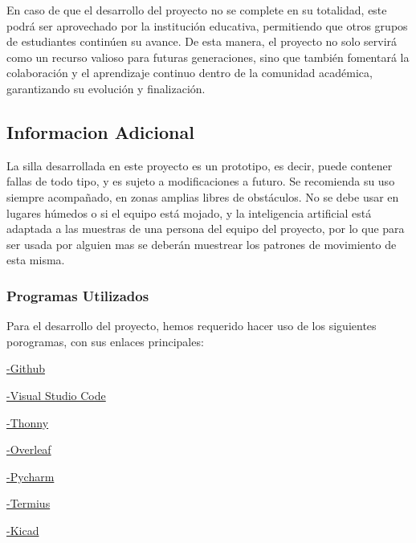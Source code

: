 \documentclass{article}
\begin{document}
En caso de que el desarrollo del proyecto no se complete en su totalidad, este podrá ser aprovechado por la institución educativa, permitiendo que otros grupos de estudiantes continúen su avance. De esta manera, el proyecto no solo servirá como un recurso valioso para futuras generaciones, sino que también fomentará la colaboración y el aprendizaje continuo dentro de la comunidad académica, garantizando su evolución y finalización.

\subsection {Informacion Adicional}
La silla desarrollada en este proyecto es un prototipo, es decir, puede contener fallas de todo tipo, y es sujeto a modificaciones a futuro. Se recomienda su uso siempre acompañado, en zonas amplias libres de obstáculos. No se debe usar en lugares húmedos o si el equipo está mojado, y la inteligencia artificial está adaptada a las muestras de una persona del equipo del proyecto, por lo que para ser usada por alguien mas se deberán muestrear los patrones de movimiento de esta misma.

\subsubsection{Programas Utilizados}
Para el desarrollo del proyecto, hemos requerido hacer uso de los siguientes porogramas, con sus enlaces principales: \newline


    \href{https://github.com/}{-Github}    
    \newline

    \href{https://code.visualstudio.com/}{-Visual Studio Code}
    \newline

    \href{https://thonny.org/}{-Thonny}
    \newline

    \href{https://es.overleaf.com/project}{-Overleaf}
    \newline

    \href{https://www.jetbrains.com/es-es/pycharm/}{-Pycharm}
    \newline

    \href{https://termius.com/}{-Termius}
    \newline

    \href{https://www.kicad.org/}{-Kicad}
    \newline
\end{document}
